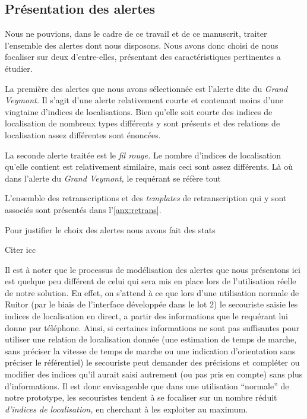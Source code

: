 \subsection{Présentation des alertes}

Nous ne pouvions, dans le cadre de ce travail et de ce manuscrit,
traiter l'ensemble des alertes dont nous disposons. Nous avons donc
choisi de nous focaliser sur deux d'entre-elles, présentant des
caractéristiques pertinentes a étudier.

La première des alertes que nous avons sélectionnée est l’alerte dite
du \emph{Grand Veymont.} Il s'agit d'une alerte relativement courte et
contenant moins d'une vingtaine d'indices de localisations. Bien
qu'elle soit courte des indices de localisation de nombreux types
différents y sont présents et des relations de localisation assez
différentes sont énoncées.



La seconde alerte traitée est le \emph{fil rouge.} Le nombre d'indices
de localisation qu'elle contient est relativement similaire, mais ceci
sont assez différents. Là où dans l'alerte du \emph{Grand Veymont,} le
requérant se réfère tout 


L'ensemble des retranscriptions et des \emph{templates} de
retranscription qui y sont associés sont présentés dans
l'\autoref{anx:retrans}.



Pour justifier le choix des alertes nous avons fait des stats 


Citer icc

Il est à noter que le processus de modélisation des alertes que nous
présentons ici est quelque peu différent de celui qui sera mis en
place lors de l'utilisation réelle de notre solution. En effet, on
s'attend à ce que lors d'une utilisation normale de Ruitor (par le
biais de l'interface développée dans le lot 2) le secouriste saisie
les indices de localisation en direct, a partir des informations que
le requérant lui donne par téléphone. Ainsi, si certaines informations
ne sont pas suffisantes pour utiliser une relation de localisation
donnée (\eg une estimation de temps de marche, sans préciser la
vitesse de temps de marche ou une indication d'orientation sans
préciser le référentiel) le secouriste peut demander des précisions et
compléter ou modifier des indices qu'il aurait saisi autrement (ou pas
pris en compte) sans plus d'informations. Il est donc envisageable que
dans une utilisation \enquote{normale} de notre prototype, les
secouristes tendent à se focaliser sur un nombre réduit
\emph{d'indices de localisation,} en cherchant à les exploiter au
maximum.

